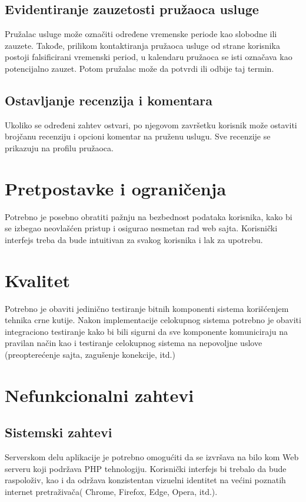 \documentclass[a4paper,12pt]{report}
\begin{document}
\subsection{Evidentiranje zauzetosti pružaoca usluge}
Pružalac usluge može označiti određene vremenske periode kao slobodne ili zauzete. Takođe, prilikom kontaktiranja pružaoca usluge od strane korisnika postoji falsificirani vremenski period, u kalendaru pružaoca se isti označava kao potencijalno zauzet. Potom pružalac može da potvrdi ili odbije taj termin.
\subsection{Ostavljanje recenzija i komentara}
Ukoliko se određeni zahtev ostvari, po njegovom završetku korisnik može ostaviti brojčanu recenziju i opcioni komentar na pruženu uslugu. Sve recenzije se prikazuju na profilu pružaoca.
\section{Pretpostavke i ograničenja}
Potrebno je posebno obratiti pažnju na bezbednost podataka korisnika, kako bi se izbegao neovlašćen pristup i osigurao nesmetan rad web sajta. Korisnički interfejs treba da bude intuitivan za svakog korisnika i lak za upotrebu.
\section{Kvalitet}
Potrebno je obaviti jedinično testiranje bitnih komponenti sistema korišćenjem tehnika crne kutije. Nakon implementacije celokupnog sistema potrebno je obaviti integraciono testiranje kako bi bili sigurni da sve komponente komuniciraju na pravilan način kao i testiranje celokupnog sistema na nepovoljne uslove (preopterećenje sajta, zagušenje konekcije, itd.)
\section{Nefunkcionalni zahtevi}
\subsection{Sistemski zahtevi}
Serverskom delu aplikacije je potrebno omogućiti da se izvršava na bilo kom Web serveru koji podržava PHP tehnologiju. Korisnički interfejs bi trebalo da bude raspoloživ, kao i da održava konzistentan vizuelni identitet na većini poznatih internet pretraživača( Chrome, Firefox, Edge, Opera, itd.).
\end{document}
